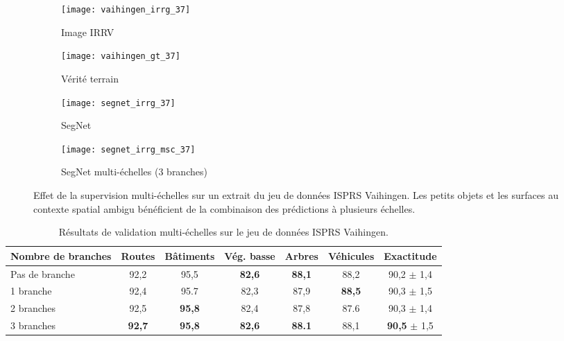 \begin{figure}[!htb]
	\hfill
	\begin{subfigure}{0.48\textwidth}
    \texttt{[image: vaihingen\_irrg\_37]}
    \caption{Image \gls{IRRV}}
    \end{subfigure}
    \hfill
    \begin{subfigure}{0.48\textwidth}
    \texttt{[image: vaihingen\_gt\_37]}
    \caption{Vérité terrain}
    \end{subfigure}
    \hfill

    \hfill
    \begin{subfigure}{0.48\textwidth}
    \texttt{[image: segnet\_irrg\_37]}
    \caption{SegNet}
    \end{subfigure}
    \hfill
    \begin{subfigure}{0.48\textwidth}
    \texttt{[image: segnet\_irrg\_msc\_37]}
    \caption{SegNet multi-échelles (3 branches)}
    \end{subfigure}
    \hfill
    \caption{Effet de la supervision multi-échelles sur un extrait du jeu de données \gls{ISPRS} Vaihingen. Les petits objets et les surfaces au contexte spatial ambigu bénéficient de la combinaison des prédictions à plusieurs échelles.\\
		\isprslegende}
    \label{fig:vaihingen_images}
\end{figure}

\begin{table}
    \caption{Résultats de validation multi-échelles sur le jeu de données \gls{ISPRS} Vaihingen.}
    \label{tab:dsn_vaihingen}
	\begin{tabularx}{\textwidth}{Y c c c c c c}
    \toprule
    Nombre de branches & Routes & Bâtiments & Vég. basse & Arbres & Véhicules & Exactitude\\
    \midrule
    Pas de branche & 92,2 & 95,5 & \textbf{82,6} & \textbf{88,1} & 88,2 & 90,2 {\small $\pm$ 1,4}\\
    1 branche & 92,4 & 95.7 & 82,3 & 87,9 & \textbf{88,5} & 90,3 {\small $\pm$ 1,5}\\
    2 branches & 92,5 & \textbf{95,8} & 82,4 & 87,8 & 87.6 & 90,3 {\small $\pm$ 1,4}\\
    3 branches & \textbf{92,7} & \textbf{95,8} & \textbf{82,6} & \textbf{88.1} & 88,1 & \textbf{90,5} {\small $\pm$ 1,5}\\
    \bottomrule
    \end{tabularx}
\end{table}

